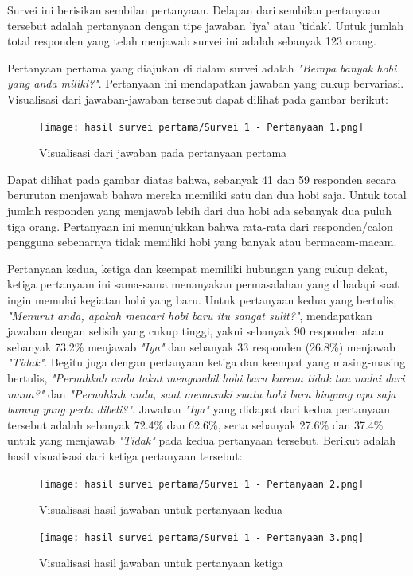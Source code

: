 \documentclass[a4paper]{article}
\begin{document}
Survei ini berisikan sembilan pertanyaan. Delapan dari sembilan pertanyaan tersebut adalah pertanyaan dengan tipe jawaban 'iya' atau 'tidak'. Untuk jumlah total responden yang telah menjawab survei ini adalah sebanyak 123 orang.

Pertanyaan pertama yang diajukan di dalam survei adalah \textit{"Berapa banyak hobi yang anda miliki?"}. Pertanyaan ini mendapatkan jawaban yang cukup bervariasi. Visualisasi dari jawaban-jawaban tersebut dapat dilihat pada gambar berikut:

\begin{figure}[h]
    \centering
    \texttt{[image: hasil survei pertama/Survei 1 - Pertanyaan 1.png]}
    \caption{Visualisasi dari jawaban pada pertanyaan pertama}
\end{figure}

Dapat dilihat pada gambar diatas bahwa, sebanyak 41 dan 59 responden secara berurutan menjawab bahwa mereka memiliki satu dan dua hobi saja. Untuk total jumlah responden yang menjawab lebih dari dua hobi ada sebanyak dua puluh tiga orang. Pertanyaan ini menunjukkan bahwa rata-rata dari responden/calon pengguna sebenarnya tidak memiliki hobi yang banyak atau bermacam-macam.

Pertanyaan kedua, ketiga dan keempat memiliki hubungan yang cukup dekat, ketiga pertanyaan ini sama-sama menanyakan permasalahan yang dihadapi saat ingin memulai kegiatan hobi yang baru. Untuk pertanyaan kedua yang bertulis, \textit{"Menurut anda, apakah mencari hobi baru itu sangat sulit?"}, mendapatkan jawaban dengan selisih yang cukup tinggi, yakni sebanyak 90 responden atau sebanyak 73.2\% menjawab \textit{"Iya"} dan sebanyak 33 responden (26.8\%) menjawab \textit{"Tidak"}. Begitu juga dengan pertanyaan ketiga dan keempat yang masing-masing bertulis, \textit{"Pernahkah anda takut mengambil hobi baru karena tidak tau mulai dari mana?"} dan \textit{"Pernahkah anda, saat memasuki suatu hobi baru bingung apa saja barang yang perlu dibeli?"}. Jawaban \textit{"Iya"} yang didapat dari kedua pertanyaan tersebut adalah sebanyak 72.4\% dan 62.6\%, serta sebanyak 27.6\% dan 37.4\% untuk yang menjawab \textit{"Tidak"} pada kedua pertanyaan tersebut. Berikut adalah hasil visualisasi dari ketiga pertanyaan tersebut:
\begin{figure}[h]
    \centering
    \texttt{[image: hasil survei pertama/Survei 1 - Pertanyaan 2.png]}
    \caption{Visualisasi hasil jawaban untuk pertanyaan kedua}
\end{figure}

\begin{figure}[h]
    \centering
    \texttt{[image: hasil survei pertama/Survei 1 - Pertanyaan 3.png]}
    \caption{Visualisasi hasil jawaban untuk pertanyaan ketiga}
\end{figure}
\end{document}
